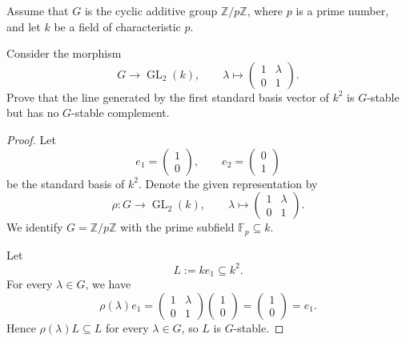 \begin{exercise}
    Assume that \(G\) is the cyclic additive group \(\mathbb{Z}/p\mathbb{Z}\), where
    \(p\) is a prime number, and let \(k\) be a field of characteristic \(p\).

    Consider the morphism
    \[
        G \longrightarrow \operatorname{GL}_2(k),
        \qquad
        \lambda \longmapsto
        \begin{pmatrix}
            1 & \lambda \\
            0 & 1
        \end{pmatrix}.
    \]
    Prove that the line generated by the first standard basis vector of \(k^2\) is
    \(G\)-stable but has no \(G\)-stable complement.
\end{exercise}

\begin{proof}
    Let
    \[
        e_1=
        \begin{pmatrix}
            1\\
            0
        \end{pmatrix},
        \qquad
        e_2=
        \begin{pmatrix}
            0\\
            1
        \end{pmatrix}
    \]
    be the standard basis of \(k^2\). Denote the given representation by
    \[
        \rho:G\longrightarrow \operatorname{GL}_2(k),
        \qquad
        \lambda\longmapsto
        \begin{pmatrix}
            1 & \lambda\\
            0 & 1
        \end{pmatrix}.
    \]
    We identify \(G=\mathbb{Z}/p\mathbb{Z}\) with the prime subfield
    \(\mathbb{F}_p\subseteq k\).

    Let
    \[
        L:=ke_1\subseteq k^2.
    \]
    For every \(\lambda\in G\), we have
    \[
        \rho(\lambda)e_1
        =
        \begin{pmatrix}
            1 & \lambda\\
            0 & 1
        \end{pmatrix}
        \begin{pmatrix}
            1\\
            0
        \end{pmatrix}
        =
        \begin{pmatrix}
            1\\
            0
        \end{pmatrix}
        =
        e_1.
    \]
    Hence \(\rho(\lambda)L\subseteq L\) for every \(\lambda\in G\), so \(L\) is
    \(G\)-stable.


\end{proof}
